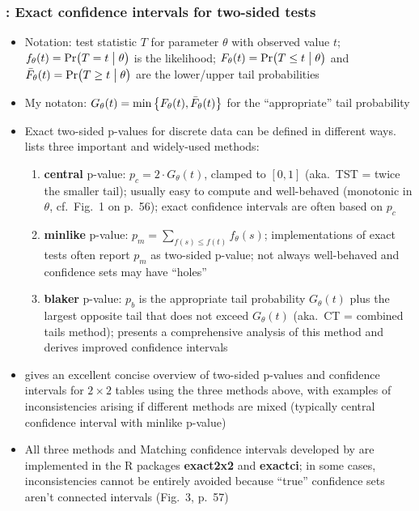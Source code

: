 \documentclass[a4paper]{article}
\begin{document}
\subsubsection{\citet{Fay:10,Fay:10a}: Exact confidence intervals for two-sided tests}
\label{sec:Fay2010}

\begin{itemize}
\item Notation: test statistic $T$ for parameter $\theta$ with observed value $t$; $f_{\theta}(t) = \mathop{\mathrm{Pr}}\bigl(T=t\bigm|\theta\bigr)$ is the likelihood; $F_{\theta}(t) = \mathop{\mathrm{Pr}}\bigl(T\leq t\bigm|\theta\bigr)$ and $\bar{F}_{\theta}(t) = \mathop{\mathrm{Pr}}\bigl(T\geq t\bigm|\theta\bigr)$ are the lower/upper tail probabilities
\item My notaton: $G_{\theta}(t) = \min\left\{F_{\theta}(t), \bar{F}_{\theta}(t)\right\}$ for the ``appropriate'' tail probability
\item Exact two-sided p-values for discrete data can be defined in different ways. \citet{Fay:10a} lists three important and widely-used methods:
  \begin{enumerate}
  \item \textbf{central} p-value: $p_c = 2\cdot G_{\theta}(t)$, clamped to $[0,1]$ (aka.\ TST = twice the smaller tail); usually easy to compute and well-behaved (monotonic in $\theta$, cf.\ Fig.~1 on p.~56); exact confidence intervals are often based on $p_c$
  \item \textbf{minlike} p-value: $p_m = \sum_{f(s)\leq f(t)} f_{\theta}(s)$; implementations of exact tests often report $p_m$ as two-sided p-value; not always well-behaved and confidence sets may have ``holes''
  \item \textbf{blaker} p-value: $p_b$ is the appropriate tail probability $G_{\theta}(t)$ plus the largest opposite tail that does not exceed $G_{\theta}(t)$ (aka.\ CT = combined tails method); \citet{Blaker:00} presents a comprehensive analysis of this method and derives improved confidence intervals
  \end{enumerate}
\item \citet{Fay:10a} gives an excellent concise overview of two-sided p-values and confidence intervals for $2\times 2$ tables using the three methods above, with examples of inconsistencies arising if different methods are mixed (typically central confidence interval with minlike p-value)
\item All three methods and Matching confidence intervals developed by \citet{Fay:10} are implemented in the R packages \textbf{exact2x2} and \textbf{exactci}; in some cases, inconsistencies cannot be entirely avoided because ``true'' confidence sets aren't connected intervals (Fig.~3, p.~57)

\end{itemize}
\end{document}
